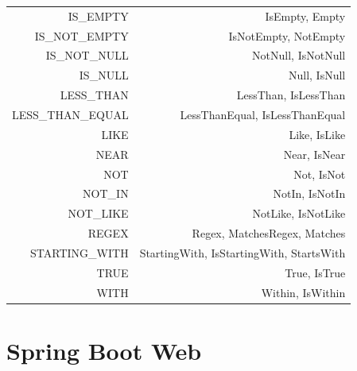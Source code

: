 \documentclass{scrartcl}
\begin{document}
\begin{table}[ht]
\begin{tabular}{ | r | r |}
    IS\_EMPTY&


    IsEmpty, Empty\\

    IS\_NOT\_EMPTY&


    IsNotEmpty, NotEmpty\\

    IS\_NOT\_NULL&


    NotNull, IsNotNull\\

    IS\_NULL&


    Null, IsNull\\

    LESS\_THAN&


    LessThan, IsLessThan\\

    LESS\_THAN\_EQUAL&


    LessThanEqual, IsLessThanEqual\\

    LIKE&


    Like, IsLike\\

    NEAR&


    Near, IsNear\\

    NOT&


    Not, IsNot\\

    NOT\_IN&


    NotIn, IsNotIn\\

    NOT\_LIKE&


    NotLike, IsNotLike\\

    REGEX&


    Regex, MatchesRegex, Matches\\

    STARTING\_WITH&


    StartingWith, IsStartingWith, StartsWith\\

    TRUE&


    True, IsTrue\\

    WITH&


    Within, IsWithin\\
    \hline
    \end{tabular}
\end{table}

\section{Spring Boot Web}
\end{document}
